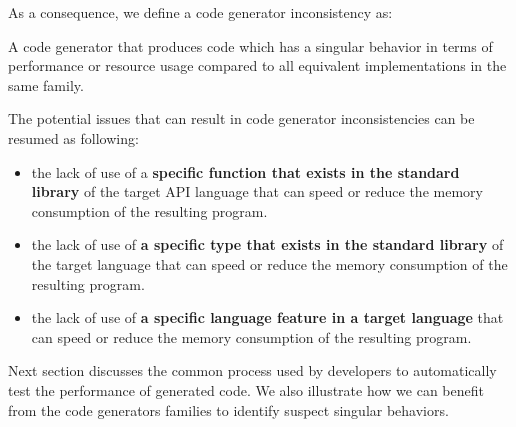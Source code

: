 As a consequence, we define a code generator inconsistency as:

\begin{mydef}
	
	A code generator that produces code which has a singular behavior in terms of performance or resource usage compared to all equivalent implementations in the same family.
\end{mydef}

The potential issues that can result in code generator inconsistencies can be resumed as following:
\begin{itemize}
	\setlength\itemsep{0em}
	\item  the lack of use of a \textbf{specific function that exists in the standard library} of the target API language  that can speed or reduce the memory consumption of the resulting program.
	\item the lack of use of \textbf{a specific type that exists in the standard library} of the target language  that can speed or reduce the memory consumption of the resulting program.
	\item  the lack of use of\textbf{ a specific language feature in a target language} that can speed or reduce the memory consumption of the resulting program. 
\end{itemize}

Next section discusses the common process used by developers to automatically test the performance of generated code. We also illustrate how we can benefit from the code generators families to identify suspect singular behaviors.



